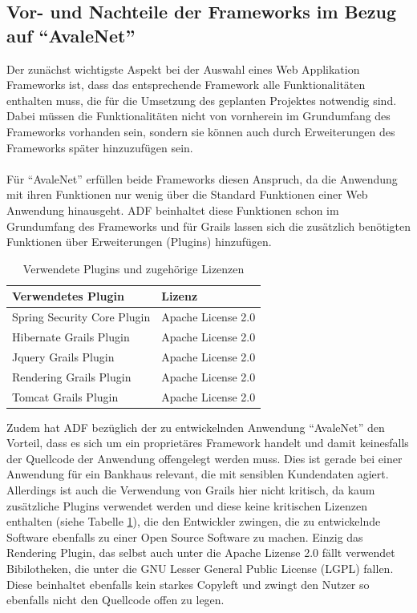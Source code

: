 \subsection{Vor- und Nachteile der Frameworks im Bezug auf "`AvaleNet"'}\label{sec:vergleich}
Der zunächst wichtigste Aspekt bei der Auswahl eines Web Applikation Frameworks ist, dass das entsprechende Framework alle Funktionalitäten enthalten muss, die für die Umsetzung des geplanten Projektes notwendig sind. Dabei müssen die Funktionalitäten nicht von vornherein im Grundumfang des Frameworks vorhanden sein, sondern sie können auch durch Erweiterungen des Frameworks später hinzuzufügen sein. \\\\
Für "`AvaleNet"' erfüllen beide Frameworks diesen Anspruch, da die Anwendung mit ihren Funktionen nur wenig über die Standard Funktionen einer Web Anwendung hinausgeht. ADF beinhaltet diese Funktionen schon im Grundumfang des Frameworks und für Grails lassen sich die zusätzlich benötigten Funktionen über Erweiterungen (Plugins) hinzufügen. \begin{table}[h]
  \centering
    \begin{tabular}{l l}
	  \toprule
	  Verwendetes Plugin & Lizenz \\
	  \midrule
	  Spring Security Core Plugin &  Apache License 2.0 \\
	  Hibernate Grails Plugin &  Apache License 2.0  \\
	  Jquery Grails Plugin &  Apache License 2.0  \\
	  Rendering Grails Plugin &  Apache License 2.0  \\
	  Tomcat Grails Plugin &  Apache License 2.0  \\
	  \bottomrule
    \end{tabular}
    \caption{Verwendete Plugins und zugehörige Lizenzen \autocite{GP2015}}
    \label{tab:plugins}
  \end{table}Zudem hat ADF bezüglich der zu entwickelnden Anwendung "`AvaleNet"' den Vorteil, dass es sich um ein proprietäres Framework handelt und damit keinesfalls der Quellcode der Anwendung offengelegt werden muss. Dies ist gerade bei einer Anwendung für ein Bankhaus relevant, die mit sensiblen Kundendaten agiert. Allerdings ist auch die Verwendung von Grails hier nicht kritisch, da kaum zusätzliche Plugins verwendet werden und diese keine kritischen Lizenzen enthalten (siehe Tabelle \ref{tab:plugins}), die den Entwickler zwingen, die zu entwickelnde Software ebenfalls zu einer Open Source Software zu machen. Einzig das Rendering Plugin, das selbst auch unter die Apache Lizense 2.0 fällt verwendet Bibilotheken, die unter die GNU Lesser General Public License\autocite{LGPL2015} (LGPL) fallen. Diese beinhaltet ebenfalls kein starkes Copyleft und zwingt den Nutzer so ebenfalls nicht den Quellcode offen zu legen.\\\\
